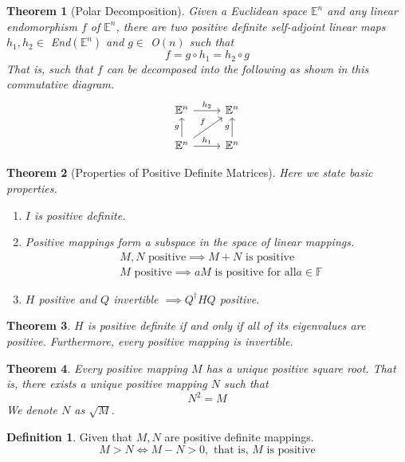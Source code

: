 \documentclass{article}
\newtheorem{theorem}{Theorem}[section]
\theoremstyle{remark}
\theoremstyle{definition}
\newtheorem{definition}{Definition}[section]
\begin{document}
    \begin{theorem}[Polar Decomposition]
    Given a Euclidean space $\mathbb{E}^n$ and any linear endomorphism $f$ of $\mathbb{E}^n$, there are two positive definite self-adjoint linear maps $h_1, h_2 \in$ End$(\mathbb{E}^n)$ and $g \in$ O$(n)$ such that
    \[f = g \circ h_1 = h_2 \circ g\]
    That is, such that $f$ can be decomposed into the following as shown in this commutative diagram. 
    \[\begin{tikzcd}
    \mathbb{E}^n \arrow{r}{h_2} & \mathbb{E}^n \\
    \mathbb{E}^n \arrow{u}{g} \arrow{ur}{f} \arrow{r}{h_1} & \mathbb{E}^n \arrow{u}{g}
    \end{tikzcd}\]
    \end{theorem}

    \begin{theorem}[Properties of Positive Definite Matrices] Here we state basic properties. 
    \begin{enumerate}
        \item $I$ is positive definite. 
        \item Positive mappings form a subspace in the space of linear mappings. 
    \begin{align*}
        &M, N \text{ positive} \implies M + N \text{ is positive} \\
        &M \text{ positive} \implies a M \text{ is positive for all} a \in \mathbb{F}
    \end{align*}
        \item $H$ positive and $Q$ invertible $\implies Q^\dagger H Q$ positive. 
    \end{enumerate}
    \end{theorem}

    \begin{theorem}
    $H$ is positive definite if and only if all of its eigenvalues are positive. Furthermore, every positive mapping is invertible.
    \end{theorem}

    \begin{theorem}
    Every positive mapping $M$ has a unique positive square root. That is, there exists a unique positive mapping $N$ such that
    \[ N^2 = M \]
    We denote $N$ as $\sqrt{M}$. 
    \end{theorem}

    \begin{definition}
    Given that $M, N$ are positive definite mappings. 
    \[M > N \iff M - N > 0, \text{ that is, $M$ is positive}\]
    \end{definition}
\end{document}
